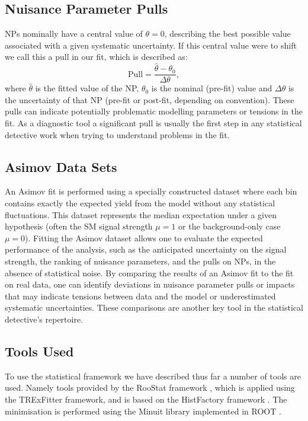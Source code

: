 \subsection{Nuisance Parameter Pulls}
NPs nominally have a central value of $\theta = 0$, describing the best possible value associated with a given systematic uncertainty. If this central value were to shift we call this a pull in our fit, which is described as: 
\begin{equation}
    \text{Pull} = \frac{\hat{\theta} - \theta_0}{\Delta\theta},
\end{equation} 
where $\hat{\theta}$ is the fitted value of the NP, $\theta_0$ is the nominal (pre-fit) value and $\Delta\theta$ is the uncertainty of that NP (pre-fit or post-fit, depending on convention). These pulls can indicate potentially problematic modelling parameters or tensions in the fit. As a diagnostic tool a significant pull is usually the first step in any statistical detective work when trying to understand problems in the fit. 
\subsection{Asimov Data Sets}
An Asimov fit is performed using a specially constructed dataset where each bin contains exactly the expected yield from the model without any statistical fluctuations. This dataset represents the median expectation under a given hypothesis (often the SM signal strength
$\mu=1$ or the background-only case $\mu = 0$). Fitting the Asimov dataset allows one to evaluate the expected performance of the analysis, such as the anticipated uncertainty on the signal strength, the ranking of nuisance parameters, and the pulls on NPs, in the absence of statistical noise. By comparing the results of an Asimov fit to the fit on real data, one can identify deviations in nuisance parameter pulls or impacts that may indicate tensions between data and the model or underestimated systematic uncertainties. These comparisons are another key tool in the statistical detective's repertoire. 
\subsection{Tools Used}
To use the statistical framework we have described thus far a number of tools are used. Namely tools provided by the RooStat framework \cite{roostats1,roostats2}, which is applied using the TRExFitter framework, and is based on the HistFactory framework \cite{histlab}. The minimisation is performed using the Minuit library implemented in ROOT \cite{minut,root}.




